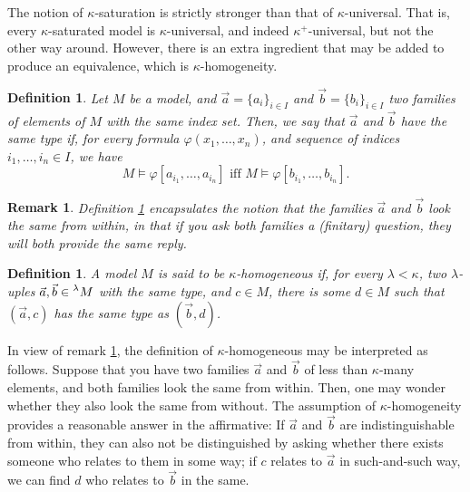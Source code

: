 \documentclass{article}
\newtheorem{remark}[theorem]{Remark}
\newtheorem{definition}[theorem]{Definition}
\theoremstyle{nonumberplain}
\begin{document}
The notion of $\kappa$-saturation is strictly stronger than that of $\kappa$-universal. That is, every $\kappa$-saturated model is $\kappa$-universal, and indeed $\kappa^+$-universal, but not the other way around. However, there is an extra ingredient that may be added to produce an equivalence, which is $\kappa$-homogeneity.

\begin{definition}\label{def:looksame}
Let $M$ be a model, and $\vec a = \{a_i\}_{i \in I}$ and $\vec b = \{b_i\}_{i \in I}$ two families of elements of $M$ with the same index set. Then, we say that $\vec a$ and $\vec b$ \emph{have the same type} if, for every formula $\varphi(x_1, \dots, x_n)$, and sequence of indices $i_1, \dots, i_n \in I$, we have
\begin{equation}
M \vDash \varphi[a_{i_1},\dots,a_{i_n}] \text{ iff } M \vDash \varphi[b_{i_1},\dots,b_{i_n}].
\end{equation}
\end{definition}

\begin{remark}\label{rmk:looksame}
Definition \ref{def:looksame} encapsulates the notion that the families $\vec a$ and $\vec b$ look the same from within, in that if you ask both families a (finitary) question, they will both provide the same reply.
\end{remark}

\begin{definition}\label{def:homogeneous}
A model $M$ is said to be $\kappa$-homogeneous if, for every $\lambda < \kappa$, two $\lambda$-uples $\vec a, \vec b \in \prescript\lambda{}M$ with the same type, and $c \in M$, there is some $d \in M$ such that $(\vec a, c)$ has the same type as $(\vec b, d)$.
\end{definition}

In view of remark \ref{rmk:looksame}, the definition of $\kappa$-homogeneous may be interpreted as follows. Suppose that you have two families $\vec a$ and $\vec b$ of less than $\kappa$-many elements, and both families look the same from within. Then, one may wonder whether they also look the same from without. The assumption of $\kappa$-homogeneity provides a reasonable answer in the affirmative: If $\vec a$ and $\vec b$ are indistinguishable from within, they can also not be distinguished by asking whether there exists someone who relates to them in some way; if $c$ relates to $\vec a$ in such-and-such way, we can find $d$ who relates to $\vec b$ in the same.
\end{document}
